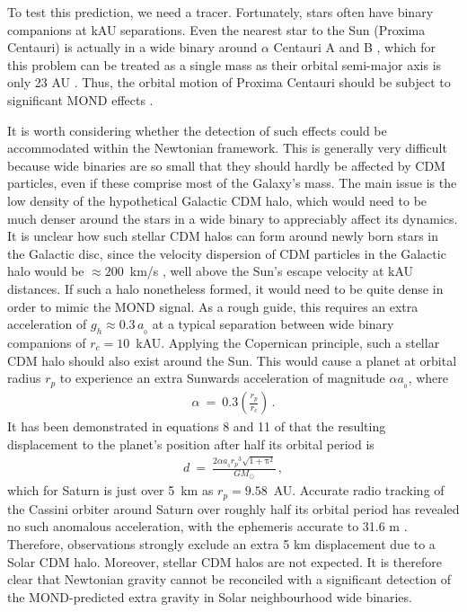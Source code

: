 \documentclass[fleqn,usenatbib,useAMS,onecolumn]{mnras} %
\begin{document}
To test this prediction, we need a tracer. Fortunately, stars often have binary companions at kAU separations. Even the nearest star to the Sun (Proxima Centauri) is actually in a wide binary around $\alpha$ Centauri A and B \citep{Kervella_2017}, which for this problem can be treated as a single mass as their orbital semi-major axis is only 23 AU \citep{Kervella_2016}. Thus, the orbital motion of Proxima Centauri should be subject to significant MOND effects \citep{Beech_2009, Beech_2011}.

It is worth considering whether the detection of such effects could be accommodated within the Newtonian framework. This is generally very difficult because wide binaries are so small that they should hardly be affected by CDM particles, even if these comprise most of the Galaxy's mass. The main issue is the low density of the hypothetical Galactic CDM halo, which would need to be much denser around the stars in a wide binary to appreciably affect its dynamics. It is unclear how such stellar CDM halos can form around newly born stars in the Galactic disc, since the velocity dispersion of CDM particles in the Galactic halo would be $\approx 200$~km/s \citep[e.g.][]{Bozorgnia_2017}, well above the Sun's escape velocity at kAU distances. If such a halo nonetheless formed, it would need to be quite dense in order to mimic the MOND signal. As a rough guide, this requires an extra acceleration of $g_h \approx 0.3 \, a_{_0}$ at a typical separation between wide binary companions of $r_c = 10$~kAU. Applying the Copernican principle, such a stellar CDM halo should also exist around the Sun. This would cause a planet at orbital radius $r_p$ to experience an extra Sunwards acceleration of magnitude $\alpha a_{_0}$, where
\begin{eqnarray}
	\alpha ~=~ 0.3 \left( \frac{r_p}{r_c} \right) \, .
\end{eqnarray}
It has been demonstrated in equations 8 and 11 of \citet{Banik_2020_dipole} that the resulting displacement to the planet's position after half its orbital period is
\begin{eqnarray}
	d ~=~ \frac{2\alpha a_{_0}{r_p}^3 \sqrt{1 + {\mathrm{\pi}}^2}}{GM_\odot} \, ,
\end{eqnarray}
which for Saturn is just over 5~km as $r_p = 9.58$~AU. Accurate radio tracking of the Cassini orbiter around Saturn over roughly half its orbital period has revealed no such anomalous acceleration, with the ephemeris accurate to 31.6 m \citep[table~11 of][]{Viswanathan_2017}. Therefore, observations strongly exclude an extra 5 km displacement due to a Solar CDM halo. Moreover, stellar CDM halos are not expected. It is therefore clear that Newtonian gravity cannot be reconciled with a significant detection of the MOND-predicted extra gravity in Solar neighbourhood wide binaries.
\end{document}
